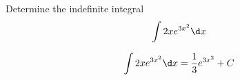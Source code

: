 \documentclass{ximera}
\author{Jason Miller}
\begin{document}
\begin{exercise}
Determine the indefinite integral
\[
\int 2xe^{3x^{2}} \d  x 
\]



\[
\int 2xe^{3x^{2}} \d x=\frac{1}{3}e^{3x^{2}}+C
\]

\end{exercise}
\end{document}
